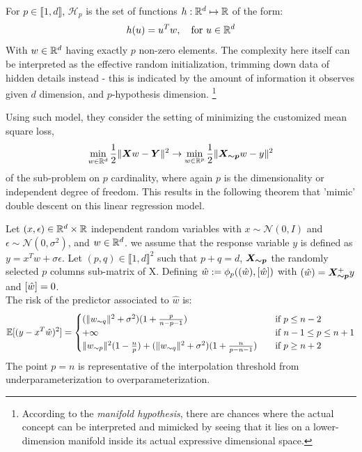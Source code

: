\documentclass[10pt]{article}
\begin{document}
\begin{definition}
For $p \in \llbracket1,d\rrbracket$, $\mathcal{H}_p$ is the set of functions $h:\mathbb{R}^d\mapsto \mathbb{R}$ of the form:
$$
h(u)=u^Tw,\quad \text{for }u \in \mathbb{R}^d
$$
With $w \in \mathbb{R}^d$ having exactly $p$ non-zero elements. The complexity here itself can be interpreted as the effective random initialization, trimming down data of hidden details instead - this is indicated by the amount of information it observes given $d$ dimension, and $p$-hypothesis dimension. \footnote{According to the \textit{manifold hypothesis}, there are chances where the actual concept can be interpreted and mimicked by seeing that it lies on a lower-dimension manifold inside its actual expressive dimensional space. }
\end{definition}
Using such model, they consider the setting of minimizing the customized mean square loss, 
\begin{equation}
\label{eq:linear_gaussian_erm}
\min_{w\in \mathbb{R}^d} \frac{1}{2}\lVert \bm{X} w - \bm{Y} \rVert^2 \to \min_{w\in \mathbb{R}^p} \frac{1}{2}\lVert \bm{X_{\sim p}} w - y \rVert^2
\end{equation}
of the sub-problem on $p$ cardinality, where again $p$ is the dimensionality or independent degree of freedom. This results in the following theorem that 'mimic' double descent on this linear regression model.
\begin{theorem}
\label{thm:double_descent_lr}
Let $(x, \epsilon)\in \mathbb{R}^d\times\mathbb{R}$ independent random variables with $x \sim \mathcal{N}(0,I)$  and $\epsilon \sim \mathcal{N}(0,\sigma^2)$, and $w \in \mathbb{R}^d$. we assume that the response variable $y$ is defined as $y=x^Tw +\sigma \epsilon$. Let $(p,q) \in \llbracket 1, d\rrbracket^2$ such that $p+q=d$, $\bm{X_{\sim p}}$ the randomly selected $p$ columns sub-matrix of X. Defining $\hat w:=\phi_p(({\hat w}),[{\hat w}])$ with $({\hat w})=\bm{X_{\sim p}}^+y$ and $[{\hat w}] = 0$.\\
The risk of the predictor associated to $\hat w$ is:
\begin{equation}
    \mathbb{E}[(y-x^T\hat w)^2] = 
\begin{cases}
(\lVert w_{\sim q} \rVert^2+\sigma^2)(1+\frac{p}{n-p-1}) &\quad\text{if } p\leq  n-2\\
+\infty &\quad\text{if }n-1 \leq p\leq  n+1\\
\lVert w_{\sim p} \rVert^2(1-\frac{n}{p}) +  (\lVert w_{\sim q} \rVert^2+\sigma^2)(1+\frac{n}{p-n-1}) &\quad\text{if }p\geq n+2\end{cases}
\end{equation}
The point $p=n$ is representative of the interpolation threshold from underparameterization to overparameterization. 
\end{theorem}
\end{document}
